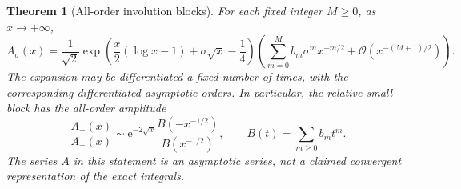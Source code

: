 \documentclass[11pt,openany]{book}
\numberwithin{equation}{chapter}
\theoremstyle{plain}
\newtheorem{theorem}{Theorem}[chapter]
\theoremstyle{definition}
\theoremstyle{remark}
\newcommand{\ee}{\mathrm e}
\newcommand{\OO}{\mathcal O}\newcommand{\bigO}{\mathcal O}
\begin{document}
\begin{theorem}[All-order involution blocks]
\label{t1:thm:ivforward}
For each fixed integer $M\ge0$, as $x\to+\infty$,
\begin{equation}
 A_\sigma(x)=\frac1{\sqrt2}
 \exp\left(\frac x2(\log x-1)+\sigma\sqrt x-\frac14\right)
 \left(\sum_{m=0}^M b_m\sigma^m x^{-m/2}
 +\OO(x^{-(M+1)/2})\right).
 \label{t1:eq:ivforward}
\end{equation}
The expansion may be differentiated a fixed number of times, with the corresponding differentiated asymptotic orders. In particular, the relative small block has the all-order amplitude
\begin{equation}
 \frac{A_-(x)}{A_+(x)}\sim
 \ee^{-2\sqrt x}\frac{B(-x^{-1/2})}{B(x^{-1/2})},
 \qquad B(t)=\sum_{m\ge0}b_mt^m.
 \label{t1:eq:ivratio}
\end{equation}
The series $A$ in this statement is an asymptotic series, not a claimed convergent representation of the exact integrals.
\end{theorem}
\end{document}
